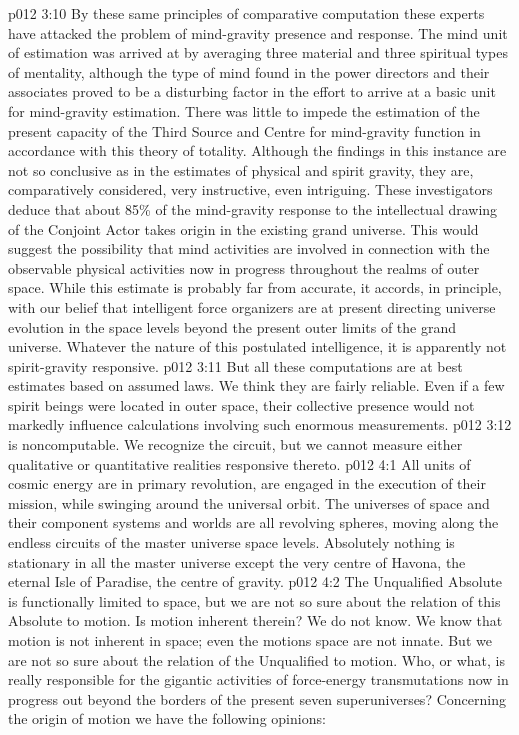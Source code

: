 \vs p012 3:10 \bibnobreakspace {} By these same principles of comparative computation these experts have attacked the problem of mind\hyp{}gravity presence and response. The mind unit of estimation was arrived at by averaging three material and three spiritual types of mentality, although the type of mind found in the power directors and their associates proved to be a disturbing factor in the effort to arrive at a basic unit for mind\hyp{}gravity estimation. There was little to impede the estimation of the present capacity of the Third Source and Centre for mind\hyp{}gravity function in accordance with this theory of totality. Although the findings in this instance are not so conclusive as in the estimates of physical and spirit gravity, they are, comparatively considered, very instructive, even intriguing. These investigators deduce that about 85\% of the mind\hyp{}gravity response to the intellectual drawing of the Conjoint Actor takes origin in the existing grand universe. This would suggest the possibility that mind activities are involved in connection with the observable physical activities now in progress throughout the realms of outer space. While this estimate is probably far from accurate, it accords, in principle, with our belief that intelligent force organizers are at present directing universe evolution in the space levels beyond the present outer limits of the grand universe. Whatever the nature of this postulated intelligence, it is apparently not spirit\hyp{}gravity responsive.
\vs p012 3:11 But all these computations are at best estimates based on assumed laws. We think they are fairly reliable. Even if a few spirit beings were located in outer space, their collective presence would not markedly influence calculations involving such enormous measurements.
\vs p012 3:12 \pc {} is noncomputable. We recognize the circuit, but we cannot measure either qualitative or quantitative realities responsive thereto.
\vs p012 4:1 All units of cosmic energy are in primary revolution, are engaged in the execution of their mission, while swinging around the universal orbit. The universes of space and their component systems and worlds are all revolving spheres, moving along the endless circuits of the master universe space levels. Absolutely nothing is stationary in all the master universe except the very centre of Havona, the eternal Isle of Paradise, the centre of gravity.
\vs p012 4:2 The Unqualified Absolute is functionally limited to space, but we are not so sure about the relation of this Absolute to motion. Is motion inherent therein? We do not know. We know that motion is not inherent in space; even the motions  space are not innate. But we are not so sure about the relation of the Unqualified to motion. Who, or what, is really responsible for the gigantic activities of force\hyp{}energy transmutations now in progress out beyond the borders of the present seven superuniverses? Concerning the origin of motion we have the following opinions:
